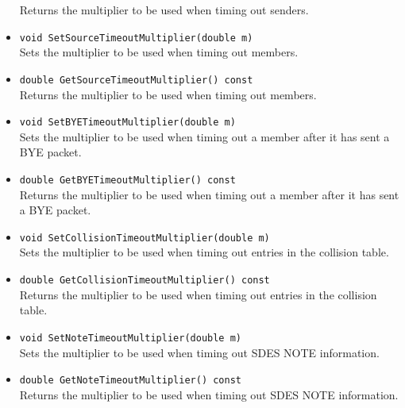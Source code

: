 \documentclass[12pt,a4paper]{article}
\begin{document}
\begin{itemize}
						Returns the multiplier to be used when timing out senders.
					\item {\tt void SetSourceTimeoutMultiplier(double m)}\\
						Sets the multiplier to be used when timing out members.
					\item {\tt double GetSourceTimeoutMultiplier() const}\\
						Returns the multiplier to be used when timing out members.
					\item {\tt void SetBYETimeoutMultiplier(double m)}\\
						Sets the multiplier to be used when timing out a member after
						it has sent a BYE packet.
					\item {\tt double GetBYETimeoutMultiplier() const}\\
						Returns the multiplier to be used when timing out a member after
						it has sent a BYE packet.
					\item {\tt void SetCollisionTimeoutMultiplier(double m)}\\
						Sets the multiplier to be used when timing out entries
						in the collision table.
					\item {\tt double GetCollisionTimeoutMultiplier() const}\\
						Returns the multiplier to be used when timing out entries
						in the collision table.
					\item {\tt void SetNoteTimeoutMultiplier(double m)}\\
						Sets the multiplier to be used when timing out SDES NOTE
						information.
					\item {\tt double GetNoteTimeoutMultiplier() const}\\
						Returns the multiplier to be used when timing out SDES NOTE
						information.
				\end{itemize}
\end{document}
